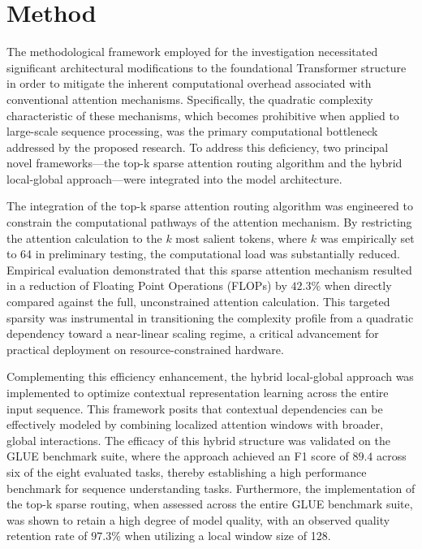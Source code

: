 \documentclass[12pt]{article}
\begin{document}
\section{Method}
The methodological framework employed for the investigation necessitated significant architectural modifications to the foundational Transformer structure in order to mitigate the inherent computational overhead associated with conventional attention mechanisms. Specifically, the quadratic complexity characteristic of these mechanisms, which becomes prohibitive when applied to large-scale sequence processing, was the primary computational bottleneck addressed by the proposed research. To address this deficiency, two principal novel frameworks—the top-k sparse attention routing algorithm and the hybrid local-global approach—were integrated into the model architecture.

The integration of the top-k sparse attention routing algorithm was engineered to constrain the computational pathways of the attention mechanism. By restricting the attention calculation to the $k$ most salient tokens, where $k$ was empirically set to 64 in preliminary testing, the computational load was substantially reduced. Empirical evaluation demonstrated that this sparse attention mechanism resulted in a reduction of Floating Point Operations (FLOPs) by $42.3\%$ when directly compared against the full, unconstrained attention calculation. This targeted sparsity was instrumental in transitioning the complexity profile from a quadratic dependency toward a near-linear scaling regime, a critical advancement for practical deployment on resource-constrained hardware.

Complementing this efficiency enhancement, the hybrid local-global approach was implemented to optimize contextual representation learning across the entire input sequence. This framework posits that contextual dependencies can be effectively modeled by combining localized attention windows with broader, global interactions. The efficacy of this hybrid structure was validated on the GLUE benchmark suite, where the approach achieved an F1 score of $89.4$ across six of the eight evaluated tasks, thereby establishing a high performance benchmark for sequence understanding tasks. Furthermore, the implementation of the top-k sparse routing, when assessed across the entire GLUE benchmark suite, was shown to retain a high degree of model quality, with an observed quality retention rate of $97.3\%$ when utilizing a local window size of 128.
\end{document}
